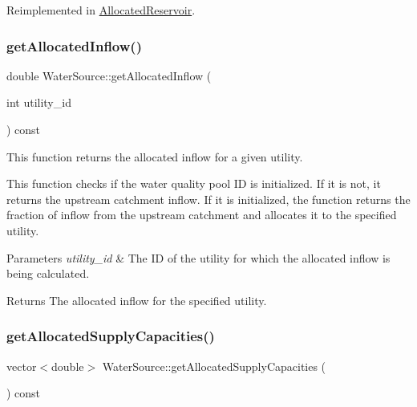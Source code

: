 Reimplemented in \mbox{\hyperlink{classAllocatedReservoir_a731381982c9245b0bf24db4082dc74c1}{Allocated\+Reservoir}}.

\mbox{\label{classWaterSource_a63b1a410b47710db049e2b2e9c3c39a0}} 
\subsubsection{\texorpdfstring{get\+Allocated\+Inflow()}{getAllocatedInflow()}}
{\footnotesize\ttfamily double Water\+Source\+::get\+Allocated\+Inflow (\begin{DoxyParamCaption}\item[{int}]{utility\+\_\+id }\end{DoxyParamCaption}) const}



This function returns the allocated inflow for a given utility. 

This function checks if the water quality pool ID is initialized. If it is not, it returns the upstream catchment inflow. If it is initialized, the function returns the fraction of inflow from the upstream catchment and allocates it to the specified utility.


\begin{DoxyParams}{Parameters}
{\em utility\+\_\+id} & The ID of the utility for which the allocated inflow is being calculated.\\
\hline
\end{DoxyParams}
\begin{DoxyReturn}{Returns}
The allocated inflow for the specified utility. 
\end{DoxyReturn}
\mbox{\label{classWaterSource_a4b05ca30a659ff351e75c487f31ff847}} 
\subsubsection{\texorpdfstring{get\+Allocated\+Supply\+Capacities()}{getAllocatedSupplyCapacities()}}
{\footnotesize\ttfamily vector$<$double$>$ Water\+Source\+::get\+Allocated\+Supply\+Capacities (\begin{DoxyParamCaption}{ }\end{DoxyParamCaption}) const}



